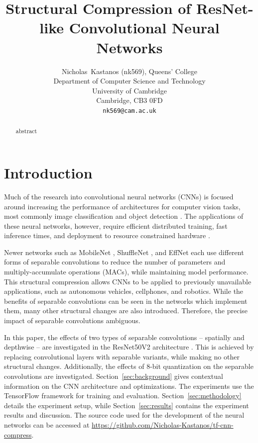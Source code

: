 \documentclass{article}
\title{Structural Compression of ResNet-like Convolutional Neural Networks}
\author{%
	Nicholas~Kastanos (nk569), Queens' College \\
	Department of Computer Science and Technology\\
	University of Cambridge\\
	Cambridge, CB3 0FD\\
	\texttt{nk569@cam.ac.uk} \\
}
\begin{document}
	
	\maketitle
	
	\begin{abstract}
		abstract
	\end{abstract}
	
	\section{Introduction}
	
	Much of the research into convolutional neural networks (CNNs) is focused around increasing the performance of architectures for computer vision tasks, most commonly image classification and object detection \cite{resnetv1, vgg, yolo, inception, adscnet}. The applications of these neural networks, however, require efficient distributed training, fast inference times, and deployment to resource constrained hardware \cite{scalable8bit,mobilenet}. 
	
	Newer networks such as MobileNet \cite{mobilenet}, ShuffleNet \cite{shufflenet}, and EffNet \cite{effnet} each use different forms of separable convolutions to reduce the number of parameters and multiply-accumulate operations (MACs), while maintaining model performance. This structural compression allows CNNs to be applied to previously unavailable applications, such as autonomous vehicles, cellphones, and robotics.	While the benefits of separable convolutions can be seen in the networks which implement them, many other structural changes are also introduced. Therefore, the precise impact of separable convolutions ambiguous.
	
	In this paper, the effects of two types of separable convolutions -- spatially and depthwise -- are investigated in the ResNet50V2 architecture \cite{resnetv2}. This is achieved by replacing convolutional layers with separable variants, while making no other structural changes. Additionally, the effects of 8-bit quantization on the separable convolutions are investigated. Section~\ref{sec:background} gives contextual information on the CNN architecture and optimizations. The experiments use the TensorFlow framework \cite{tensorflow2015-whitepaper} for training and evaluation. Section~\ref{sec:methodology} details the experiment setup, while Section~\ref{sec:results} contains the experiment results and discussion. The source code used for the development of the neural networks can be accessed at \url{https://github.com/Nicholas-Kastanos/tf-cnn-compress}.
		
\end{document}
